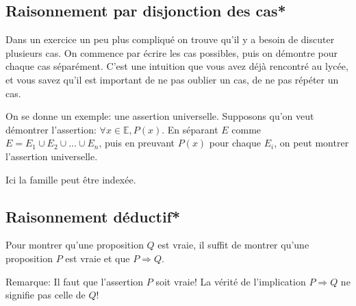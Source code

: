 \documentclass{article}
\begin{document}
\subsection{Raisonnement par disjonction des cas*}

Dans un exercice un peu plus compliqué on trouve qu'il y a besoin de discuter plusieurs cas. On commence par écrire les cas possibles, puis on démontre pour chaque cas séparément. C'est une intuition que vous avez déjà rencontré au lycée, et vous savez qu'il est important de ne pas oublier un cas, de ne pas répéter un cas.


\begin{tcolorbox}[colback=green!5!white,colframe=green!75!black,title=Point méthode 4.8]


On se donne un exemple: une assertion universelle. Supposons qu'on veut démontrer l'assertion: $\forall x \in \mathbb{E}, P(x)$. En séparant $E$ comme $E = E_1 \cup E_2 \cup ... \cup E_n$, puis en preuvant $P(x)$ pour chaque $E_i$, on peut montrer l'assertion universelle.

\tcblower

Ici la famille peut être indexée.




\end{tcolorbox}


\begin{tcolorbox}[colback=cyan!5!white,colframe=cyan!75!black,title=Exercice]


\end{tcolorbox}



\subsection{Raisonnement déductif*}

\begin{tcolorbox}[colback=green!5!white,colframe=green!75!black,title=Point méthode 4.9]

Pour montrer qu'une proposition \( Q \) est vraie, il suffit de montrer qu'une proposition \( P \) est vraie et que \( P \Rightarrow Q \).


\end{tcolorbox}

Remarque: Il faut que l'assertion $P$ soit vraie! La vérité de l'implication \( P \Rightarrow Q \) ne signifie pas celle de $Q$!

\begin{tcolorbox}[colback=cyan!5!white,colframe=cyan!75!black,title=Exercice]


\end{tcolorbox}
\end{document}
